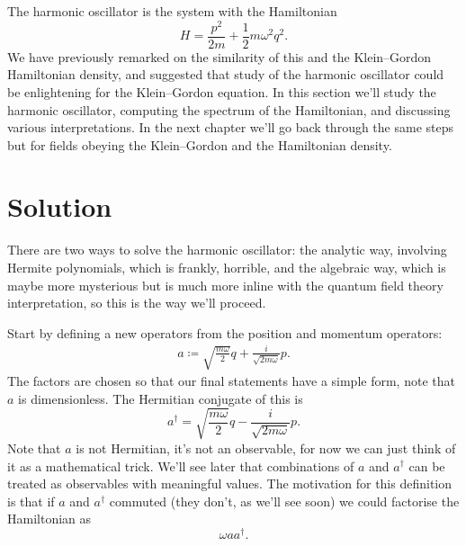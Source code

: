 \documentclass[fleqn]{NotesClass}
\newcommand{\hermit}{{\dagger}}
\begin{document}
    The harmonic oscillator is the system with the Hamiltonian
    \begin{equation}
        H = \frac{p^2}{2m} + \frac{1}{2}m\omega^2 q^2.
    \end{equation}
    We have previously remarked on the similarity of this and the Klein--Gordon Hamiltonian density, and suggested that study of the harmonic oscillator could be enlightening for the Klein--Gordon equation.
    In this section we'll study the harmonic oscillator, computing the spectrum of the Hamiltonian, and discussing various interpretations.
    In the next chapter we'll go back through the same steps but for fields obeying the Klein--Gordon and the Hamiltonian density.
    
    \section{Solution}
    There are two ways to solve the harmonic oscillator: the analytic way, involving Hermite polynomials, which is frankly, horrible, and the algebraic way, which is maybe more mysterious but is much more inline with the quantum field theory interpretation, so this is the way we'll proceed.
    
    Start by defining a new operators from the position and momentum operators:
    \begin{align}
        a \coloneqq \sqrt{\frac{m\omega}{2}} q + \frac{i}{\sqrt{2m\omega}} p.
    \end{align}
    The factors are chosen so that our final statements have a simple form, note that \(a\) is dimensionless.
    The Hermitian conjugate of this is
    \begin{equation}
        a^\hermit = \sqrt{\frac{m\omega}{2}} q - \frac{i}{\sqrt{2m\omega}} p.
    \end{equation}
    Note that \(a\) is not Hermitian, it's not an observable, for now we can just think of it as a mathematical trick.
    We'll see later that combinations of \(a\) and \(a^\hermit\) can be treated as observables with meaningful values.
    The motivation for this definition is that if \(a\) and \(a^\hermit\) commuted (they don't, as we'll see soon) we could factorise the Hamiltonian as
    \begin{equation}
        \omega aa^\hermit.
    \end{equation}
    
\end{document}
